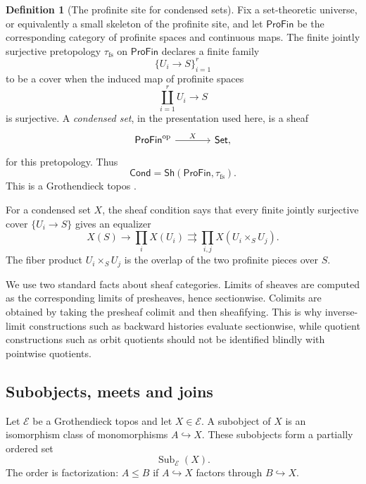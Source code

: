 \documentclass[10pt]{amsart}
\newcommand{\ProFin}{\mathsf{ProFin}}
\newcommand{\Set}{\mathsf{Set}}
\newcommand{\Cond}{\mathsf{Cond}}
\newcommand{\Sh}{\mathsf{Sh}}
\newcommand{\Sub}{\operatorname{Sub}}
\theoremstyle{plain}
\theoremstyle{definition}
\newtheorem{definition}[theorem]{Definition}
\begin{document}
\begin{definition}[The profinite site for condensed sets]
Fix a set-theoretic universe, or equivalently a small skeleton of the profinite
site, and let $\ProFin$ be the corresponding category of profinite spaces and
continuous maps. The finite jointly surjective pretopology $\tau_{\mathrm{fs}}$
on $\ProFin$ declares a finite family
\[
  \{U_i\to S\}_{i=1}^r
\]
to be a cover when the induced map of profinite spaces
\[
  \coprod_{i=1}^r U_i\longrightarrow S
\]
is surjective. A \emph{condensed set}, in the presentation used here, is a
sheaf
\[
\begin{tikzcd}[column sep=large]
\ProFin^{\mathrm{op}}
\arrow[r, "{X}"]
&
\Set ,
\end{tikzcd}
\]
for this pretopology. Thus
\[
  \Cond=\Sh(\ProFin,\tau_{\mathrm{fs}}).
\]
This is a Grothendieck topos \cite{ClausenScholze,LeStumCondensed}.
\end{definition}

For a condensed set $X$, the sheaf condition says that every finite jointly
surjective cover $\{U_i\to S\}$ gives an equalizer
\[
  X(S)\longrightarrow \prod_i X(U_i)
  \rightrightarrows
  \prod_{i,j}X(U_i\times_S U_j).
\]
The fiber product $U_i\times_S U_j$ is the overlap of the two profinite pieces
over $S$.

We use two standard facts about sheaf categories. Limits of sheaves are
computed as the corresponding limits of presheaves, hence sectionwise.
Colimits are obtained by taking the presheaf colimit and then sheafifying. This
is why inverse-limit constructions such as backward histories evaluate
sectionwise, while quotient constructions such as orbit quotients should not
be identified blindly with pointwise quotients.

\subsection{Subobjects, meets and joins}

Let $\mathcal E$ be a Grothendieck topos and let $X\in\mathcal E$. A subobject
of $X$ is an isomorphism class of monomorphisms $A\hookrightarrow X$. These
subobjects form a partially ordered set
\[
  \Sub_{\mathcal E}(X).
\]
The order is factorization: $A\le B$ if $A\hookrightarrow X$ factors through
$B\hookrightarrow X$.
\end{document}

